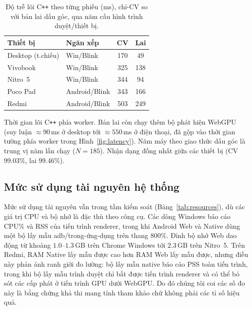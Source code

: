 \documentclass[conference]{IEEEtran}
\begin{document}
\begin{table}[!htb]
\caption{Độ trễ lõi C\texttt{++} theo từng phiếu (ms), chỉ-CV so với bản lai dấu
góc, qua năm cấu hình trình duyệt/thiết bị.}
\label{tab:latency}
\centering
\setlength{\tabcolsep}{6pt}
\footnotesize
\begin{tabular}{llcc}
\toprule
\textbf{Thiết bị} & \textbf{Ngăn xếp} & \textbf{CV} & \textbf{Lai} \\
\midrule
Desktop (t.chiếu) & Win/Blink     & 170 & 49  \\
Vivobook     & Win/Blink     & 325 & 138 \\
Nitro~5      & Win/Blink     & 344 & 94  \\
Poco Pad     & Android/Blink & 343 & 166 \\
Redmi        & Android/Blink & 503 & 249 \\
\bottomrule
\end{tabular}

\vspace{2pt}
\parbox{\columnwidth}{\footnotesize
Thời gian lõi C\texttt{++} phía worker. Bản lai còn chạy thêm bộ phát hiện WebGPU
(suy luận $\approx90$\,ms ở desktop tới $\approx550$\,ms ở điện thoại, đã gộp vào
thời gian tường phía worker trong Hình~\ref{fig:latency}). Năm máy theo giao thức
dấu góc là trung vị năm lần chạy ($N{=}185$). Nhận dạng đồng nhất giữa các thiết
bị (CV 99.03\%, lai 99.46\%).}
\end{table}
\FloatBarrier
\subsection{Mức sử dụng tài nguyên hệ thống}
\label{sec:resources}

Mức sử dụng tài nguyên vẫn trong tầm kiểm soát (Bảng~\ref{tab:resources}), dù các
giá trị CPU và bộ nhớ là đặc thù theo công cụ. Các dòng Windows báo cáo CPU\% và
RSS của tiến trình renderer, trong khi Android Web và Native dùng một bộ lấy mẫu
adb/trong-ứng-dụng trên thang $800\%$. Đỉnh bộ nhớ Web dao động từ khoảng
$1.0$--$1.3$\,GB trên Chrome Windows tới $2.3$\,GB trên Nitro~5. Trên Redmi, RAM
Native lấy mẫu được cao hơn RAM Web lấy mẫu được, nhưng điều này phản ánh ranh
giới đo lường: bộ lấy mẫu native báo cáo PSS toàn tiến trình, trong khi bộ lấy mẫu
trình duyệt chỉ bắt được tiến trình renderer và có thể bỏ sót các cấp phát ở tiến
trình GPU dưới WebGPU. Do đó chúng tôi coi các số đo này là bằng chứng khả thi
mang tính tham khảo chứ không phải các tỉ số hiệu quả.
\end{document}
